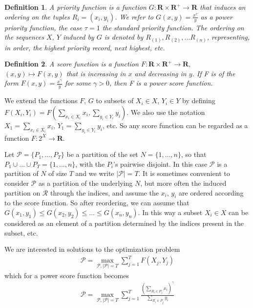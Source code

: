 \documentclass{article}
\newtheorem{definition}{Definition}
\theoremstyle{case}
\begin{document}
\begin{definition}
A priority function is a function $G\colon \mathbf{R} \times \mathbf{R}^{+} \to \mathbf{R}$ that induces an ordering on the tuples $R_i = \left(x_i, y_i\right)$. We refer to $G(x,y) = \frac{x^{\tau}}{y}$ as a power priority function, the case $\tau = 1$ the standard priority function. The ordering on the sequences $X$, $Y$ induced by $G$ is denoted by $R_{(1)}, R_{(2)}, \dots R_{(n)}$, representing, in order, the highest priority record, next highest, etc. 
\end{definition}

\begin{definition}
A score function is a function $F\colon \mathbf{R} \times \mathbf{R}^{+} \to \mathbf{R}$, $(x,y)\mapsto F(x,y)$ that is increasing in $x$ and decreasing in $y$. If F is of the form $F(x,y) = \frac{x^\gamma}{y}$ for some $\gamma > 0$, then F is a power score function. 
\end{definition}

We extend the functions $F$, $G$ to subsets of $X_i \in X$, $Y_i \in Y$ by defining $F(X_i, Y_i) = F(\sum_{x_i \in X_i} x_i, \sum_{y_i \in Y_i} y_i)$. We also use the notation $X_1 = \sum_{x_i \in X_i}x_i$, $Y_1 = \sum_{y_i \in Y_i}y_i$, etc. So any score function can be regarded as a function $F \colon 2^X \to \mathbf{R}$.

\vspace{4pt}

Let $\mathcal{P} = \{P_1, \dots, P_T\}$ be a partition of the set $N = \{1, \dots, n\}$, so that $P_1 \cup \dots \cup P_T = \{1, \dots, n\}$, with the $P_i$'s pairwise disjoint. In this case $\mathcal{P}$ is a partition of $N$ of size $T$ and we write $\vert \mathcal{P} \vert = T$. It is sometimes convenient to consider $\mathcal{P}$ as a partition of the underlying $N$, but more often the induced partition on $\mathcal{R}$ through the indices, and assume the $x_i$, $y_i$ are ordered according to the score function. So after reordering, we can assume that $G(x_1, y_1) \leq G(x_2, y_2) \leq \dots \leq G(x_n, y_n)$. In this way a subset $X_i \in X$ can be considered as an element of a partition determined by the indices present in the subset, etc.

We are interested in solutions to the optimization problem
\begin{align} \label{eq0}
\mathcal{P} = \max_{\mathcal{P}, \vert \mathcal{P} \vert = T} {\sum\limits_{j=1}^{T}F\left( X_j, Y_j\right)}
\end{align}
which for a power score function becomes
\begin{align} \label{eq1}
\mathcal{P} = \max_{\mathcal{P}, \vert \mathcal{P} \vert = T}\sum_{j=1}^{T}\frac{(\sum_{R_i \in P_j}x_i)^\gamma}{\sum_{R_i \in P_j}y_i}
\end{align}
\end{document}
